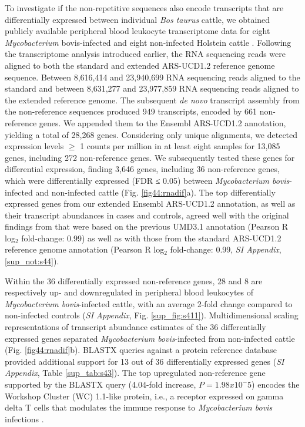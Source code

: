 \documentclass[../main.tex]{subfiles}
\begin{document}
To investigate if the non-repetitive sequences also encode transcripts that are differentially expressed between individual \emph{Bos taurus} cattle, we obtained publicly available peripheral blood leukocyte transcriptome data for eight \emph{Mycobacterium} bovis-infected and eight non-infected Holstein cattle \citep{mcloughlin2014rna}. Following the transcriptome analysis introduced earlier, the RNA sequencing reads were aligned to both the standard and extended ARS-UCD1.2 reference genome sequence. Between 8,616,414 and 23,940,699 RNA sequencing reads aligned to the standard and between 8,631,277 and 23,977,859 RNA sequencing reads aligned to the extended reference genome. The subsequent \emph{de novo} transcript assembly from the non-reference sequences produced 949 transcripts, encoded by 661 non-reference genes. We appended them to the Ensembl ARS-UCD1.2 annotation, yielding a total of 28,268 genes. Considering only unique alignments, we detected expression levels $≥$ 1 counts per million in at least eight samples for 13,085 genes, including 272 non-reference genes. We subsequently tested these genes for differential expression, finding 3,646 genes, including 36 non-reference genes, which were differentially expressed (FDR ≤ 0.05) between \emph{Mycobacterium bovis}-infected and non-infected cattle (Fig. \ref{fig44:rnadif}a). The top differentially expressed genes from our extended Ensembl ARS-UCD1.2 annotation, as well as their transcript abundances in cases and controls, agreed well with the original findings from \citet{mcloughlin2014rna} that were based on the previous UMD3.1 annotation (Pearson R log$_2$ fold-change: 0.99) as well as with those from the standard ARS-UCD1.2 reference genome annotation (Pearson R log$_2$ fold-change: 0.99, \emph{SI Appendix}, \ref{sup_not:s44}). 


Within the 36 differentially expressed non-reference genes, 28 and 8 are respectively up- and downregulated in peripheral blood leukocytes of \emph{Mycobacterium bovis}-infected cattle, with an average 2-fold change compared to non-infected controls (\emph{SI Appendix}, Fig. \ref{sup_fig:s411}). Multidimensional scaling representations of transcript abundance estimates of the 36 differentially expressed genes separated \emph{Mycobacterium bovis}-infected from non-infected cattle (Fig. \ref{fig44:rnadif}b). BLASTX queries against a protein reference database provided additional support for 13 out of 36 differentially expressed genes (\emph{SI Appendix}, Table \ref{sup_tab:s43}). The top upregulated non-reference gene supported by the BLASTX query (4.04-fold increase, $P=1.98x10^-5$) encodes the Workshop Cluster (WC) 1.1-like protein, i.e., a receptor expressed on gamma delta T cells that modulates the immune response to \emph{Mycobacterium bovis} infections \citep{mcgill2014specific,damani2018variegated,kennedy2002modulation}. 
\end{document}

